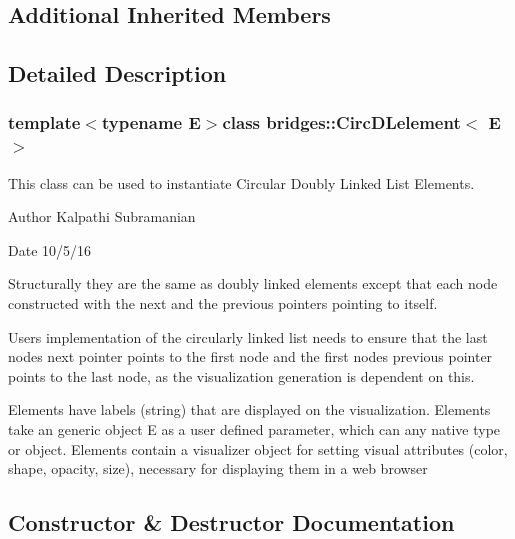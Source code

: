 \subsection*{Additional Inherited Members}


\subsection{Detailed Description}
\subsubsection*{template$<$typename E$>$class bridges\+::\+Circ\+D\+Lelement$<$ E $>$}

This class can be used to instantiate Circular Doubly Linked List Elements. 

\begin{DoxyAuthor}{Author}
Kalpathi Subramanian 
\end{DoxyAuthor}
\begin{DoxyDate}{Date}
10/5/16
\end{DoxyDate}
Structurally they are the same as doubly linked elements except that each node constructed with the next and the previous pointers pointing to itself.

User\textquotesingle{}s implementation of the circularly linked list needs to ensure that the last node\textquotesingle{}s next pointer points to the first node and the first node\textquotesingle{}s previous pointer points to the last node, as the visualization generation is dependent on this.

Elements have labels (string) that are displayed on the visualization. Elements take an generic object E as a user defined parameter, which can any native type or object. Elements contain a visualizer object for setting visual attributes (color, shape, opacity, size), necessary for displaying them in a web browser 

\subsection{Constructor \& Destructor Documentation}
\hypertarget{classbridges_1_1_circ_d_lelement_a35279302f5fb5297eeb6efead475921e}{}
